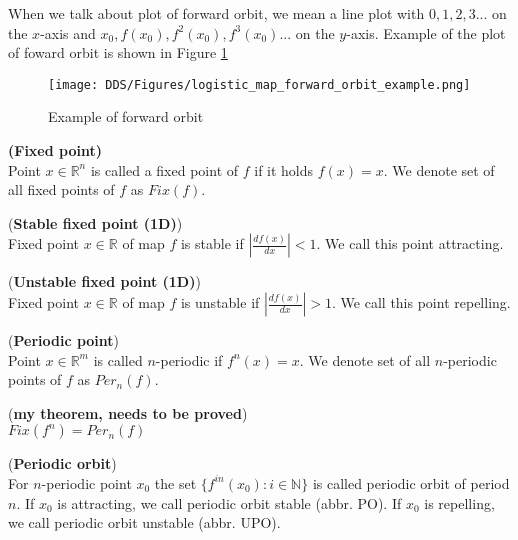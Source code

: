\begin{remark}
    When we talk about plot of forward orbit, we mean a line plot with
    $0, 1, 2, 3...$ on the $x$-axis and $x_0, f(x_0), f^2(x_0), f^3(x_0)...$ on the $y$-axis.
    Example of the plot of foward orbit is shown in Figure \ref{fig:forward_orbit_example}
\end{remark}

\begin{figure}[!h]
    \centering
    \texttt{[image: DDS/Figures/logistic\_map\_forward\_orbit\_example.png]}
    \caption{Example of forward orbit}
    \label{fig:forward_orbit_example}
\end{figure}


\begin{definition} \textbf{(Fixed point)} \\
    \label{def:fixed point}
    Point $x \in \mathbb{R}^n$ is called a fixed point of $f$ if it holds $f(x) = x$.
    We denote set of all fixed points of $f$ as $Fix(f)$. \cite{Devaney20211026}
\end{definition}

\begin{definition} (\textbf{Stable fixed point (1D)})\\
    Fixed point $x \in \mathbb{R}$ of map $f$ is stable if $|\frac{d{f(x)}}{dx}| < 1$.
    We call this point attracting.
\end{definition}

\begin{definition} (\textbf{Unstable fixed point (1D)})\\
    Fixed point $x \in \mathbb{R}$ of map $f$ is unstable if $|\frac{d{f(x)}}{dx}| > 1$.
    We call this point repelling.
\end{definition}

\begin{definition} (\textbf{Periodic point})\\
    Point $x \in \mathbb{R}^m$ is called $n$-periodic if $f^{n}(x)=x$.
    We denote set of all $n$-periodic points of $f$ as $Per_{n}(f)$. \cite{Devaney20211026}
\end{definition}

\begin{theorem} (\textbf{my theorem, needs to be proved})\\
$Fix(f^n) = Per_n(f)$
\end{theorem}

\begin{definition} (\textbf{Periodic orbit})\\
    For $n$-periodic point $x_0$ the set $\{f^{in}(x_0):i \in \mathbb{N}\}$ is called periodic orbit of period $n$.
    If $x_0$ is attracting, we call periodic orbit stable (abbr. PO).
    If $x_0$ is repelling, we call periodic orbit unstable (abbr. UPO).
\end{definition}

